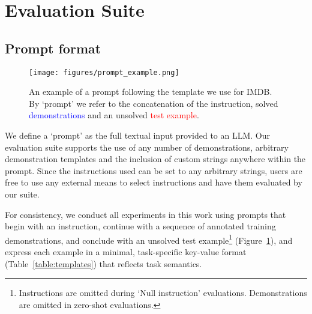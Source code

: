 \section{Evaluation Suite}

\subsection{Prompt format}

\begin{figure}[t]
    \centering
    \texttt{[image: figures/prompt\_example.png]}
    \caption{
        An example of a prompt following the template we use for IMDB. By  `prompt' we refer to the concatenation of the \textcolor{darkyellow}{instruction}, solved \textcolor{blue}{demonstrations} and an unsolved \textcolor{red}{test example}.
    }
    \label{fig:prompt_example}
\end{figure}
We define a `prompt' as the full textual input provided to an LLM. Our evaluation suite supports the use of any number of demonstrations, arbitrary demonstration templates and the inclusion of custom strings anywhere within the prompt. Since the instructions used can be set to any arbitrary strings, users are free to use any external means to select instructions and have them evaluated by our suite.

For consistency, we conduct all experiments in this work using prompts that begin with an instruction, continue with a sequence of annotated training demonstrations, and conclude with an unsolved test example\footnote{Instructions are omitted during `Null instruction' evaluations. Demonstrations are omitted in zero-shot evaluations.} (Figure~\ref{fig:prompt_example}), and express each example in a minimal, task-specific key-value format (Table~\ref{table:templates}) that reflects task semantics.

